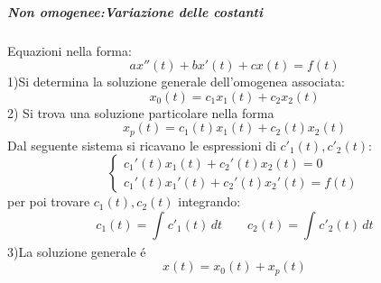 \documentclass[a4paper, titlepage]{report}%
\theoremstyle{definition} %
\theoremstyle{plain}
\theoremstyle{plain}
\theoremstyle{remark}
\theoremstyle{remark}
\theoremstyle{plain}
\theoremstyle{plain}
\theoremstyle{plain}
\theoremstyle{plain}
\theoremstyle{plain}
\begin{document}
\subparagraph*{Non omogenee:Variazione delle costanti}
Equazioni nella forma:
\[
     ax''(t) + bx'(t) + cx(t)= f(t)
\]
1)Si determina la soluzione generale dell'omogenea associata:
\[
     x_0(t) = c_1 x_1(t) + c_2x_2(t)    
\]
2) Si trova una soluzione particolare nella forma
\[
     x_p(t) = c_1(t) x_1(t) + c_2(t) x_2(t)    
\]
Dal seguente sistema si ricavano le espressioni di $c'_1(t), c'_2(t)$:
\[
   \begin{cases}
    c_1'(t) x_1(t) + c_2'(t) x_2(t) = 0 
    \\
    c_1'(t) x_1'(t) + c_2'(t) x_2'(t) = f(t)
   \end{cases}    
\]
per poi trovare $c_1(t), c_2(t)$ integrando:
\[
    c_1(t) = \int_{}^{} c'_1(t) \, dt \qquad c_2(t) = \int_{}^{} c'_2(t) \,dt
\]
3)La soluzione generale \'e
\[
      x(t)= x_0(t) + x_p(t)    
\]
\end{document}
